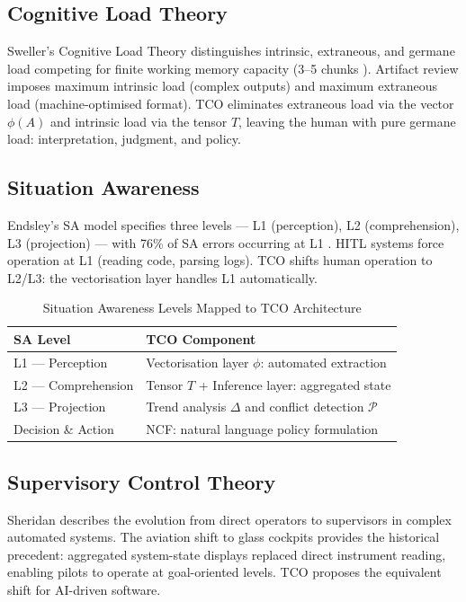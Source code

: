\documentclass[manuscript,review,anonymous]{acmart}
\begin{document}
\subsection{Cognitive Load Theory}

Sweller's Cognitive Load Theory \cite{sweller1988} distinguishes intrinsic,
extraneous, and germane load competing for finite working memory capacity
(3--5 chunks \cite{cowan2001}). Artifact review imposes maximum intrinsic load
(complex outputs) and maximum extraneous load (machine-optimised format). TCO
eliminates extraneous load via the vector $\phi(A)$ and intrinsic load via the tensor
$T$, leaving the human with pure germane load: interpretation, judgment, and policy.

\subsection{Situation Awareness}

Endsley's SA model \cite{endsley1995} specifies three levels --- L1 (perception),
L2 (comprehension), L3 (projection) --- with 76\% of SA errors occurring at
L1 \cite{endsley2000}. HITL systems force operation at L1 (reading code, parsing logs).
TCO shifts human operation to L2/L3: the vectorisation layer handles L1 automatically.

\begin{table}[t]
  \caption{Situation Awareness Levels Mapped to TCO Architecture}
  \label{tab:sa-mapping}
  \begin{tabular}{p{3cm}p{5cm}}
    \toprule
    SA Level & TCO Component \\
    \midrule
    L1 --- Perception & Vectorisation layer $\phi$: automated extraction \\
    L2 --- Comprehension & Tensor $T$ + Inference layer: aggregated state \\
    L3 --- Projection & Trend analysis $\Delta$ and conflict detection $\mathcal{P}$ \\
    Decision \& Action & NCF: natural language policy formulation \\
    \bottomrule
  \end{tabular}
\end{table}

\subsection{Supervisory Control Theory}

Sheridan \cite{sheridan1992} describes the evolution from direct operators to
supervisors in complex automated systems. The aviation shift to glass cockpits
provides the historical precedent: aggregated system-state displays replaced
direct instrument reading, enabling pilots to operate at goal-oriented levels.
TCO proposes the equivalent shift for AI-driven software.
\end{document}
